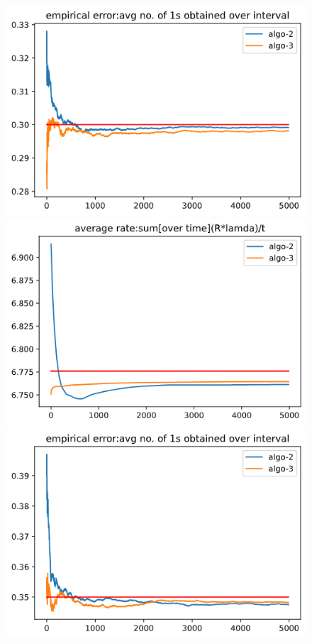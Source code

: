 \documentclass[BTech,thesis]{iitmdiss}
\begin{document}
\begin{figure}[H]
    \begin{center}
      \includegraphics[scale=0.4]{33-m-err.png}
      \includegraphics[scale=0.4]{33-m-rate.png}
      \includegraphics[scale=0.4]{45-m-err.png}

\end{center}
\end{figure}
\end{document}

